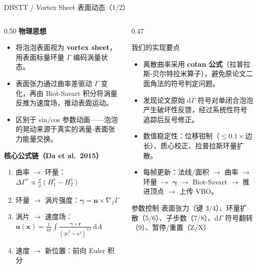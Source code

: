 \documentclass[11pt,aspectratio=169]{beamer}
\begin{document}
\begin{frame}{DBSTT / Vortex Sheet 表面动态（1/2）}
  \small
  \begin{columns}[T]
    \begin{column}{0.50\linewidth}
      \textbf{物理思想}
      \begin{itemize}
        \item 将泡泡表面视为 \textbf{vortex sheet}，用表面标量环量 \(\Gamma\) 编码涡量状态。
        \item 表面张力通过曲率差驱动 \(\Gamma\) 变化，再由 Biot-Savart 积分将涡量反推为速度场，推动表面运动。
        \item 区别于 sin/cos 参数动画——泡泡的晃动来源于真实的涡量-表面张力能量交换。
      \end{itemize}
      \vspace{0.3em}
      \textbf{核心公式链（Da et al.\ 2015）}
      \begin{enumerate}
        \item 曲率 \(\rightarrow\) 环量：\(\Delta\Gamma^v \propto \frac{\sigma}{\rho}(H_1^v-H_2^v)\)
        \item 环量 \(\rightarrow\) 涡片强度：\(\boldsymbol{\gamma}=\mathbf{n}\times\nabla_f\Gamma\)
        \item 涡片 \(\rightarrow\) 速度场：\(\mathbf{u}(\mathbf{x})=\frac{1}{4\pi}\int\frac{\boldsymbol{\gamma}\times\mathbf{r}}{(|\mathbf{r}|^2+\alpha^2)^{3/2}}\,\mathrm{d}A\)
        \item 速度 \(\rightarrow\) 新位置：前向 Euler 积分
      \end{enumerate}
    \end{column}
    \begin{column}{0.47\linewidth}
      \begin{block}{我们的实现要点}
        \begin{itemize}
          \item 离散曲率采用 \textbf{cotan 公式}（拉普拉斯-贝尔特拉米算子），避免原论文二面角法的符号判定问题。
          \item 发现论文原始 d\(\Gamma\) 符号对单闭合泡泡产生破坏性反馈，经过系统性符号追踪后反号修正。
          \item 数值稳定性：位移钳制（\(\le 0.1\times\)边长）、质心校正、拉普拉斯环量扩散。
          \item 每帧更新：法线/面积 \(\rightarrow\) 曲率 \(\rightarrow\) 环量 \(\rightarrow\) \(\boldsymbol{\gamma}\) \(\rightarrow\) Biot-Savart \(\rightarrow\) 推进顶点 \(\rightarrow\) 上传 VBO。
        \end{itemize}
      \end{block}
      \begin{block}{参数控制}
        \scriptsize
        表面张力（键 3/4）、环量扩散（5/6）、子步数（7/8）、d\(\Gamma\) 符号翻转（9）、暂停/重置（Z/X）
      \end{block}
    \end{column}
  \end{columns}
\end{frame}
\end{document}
